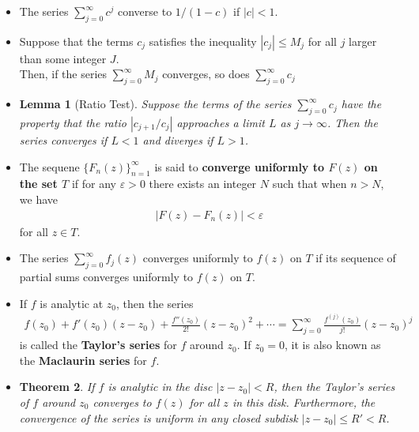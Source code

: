 \documentclass[10pt]{article}
\newtheorem{lemma}{Lemma}[section]
\newtheorem{theorem}[lemma]{Theorem}
\newcommand{\ra}{\rightarrow}
\begin{document}
  \begin{itemize}
    \item The series $\sum_{j=0}^\infty c^j$ converse to $1 / (1-c)$ if $|c| < 1$.

    \item Suppose that the terms $c_j$ satisfies the inequality $|c_j| \leq M_j$ for all $j$ larger than some integer $J$.\\Then, if the series $\sum_{j=0}^\infty M_j$ converges, so does $\sum_{j=0}^\infty c_j$

    \item \begin{lemma}[Ratio Test]
      Suppose the terms of the series $\sum_{j=0}^\infty c_j$ have the property that the ratio $|c_{j+1}/c_j|$ approaches a limit $L$ as $j \ra \infty$. Then the series converges if $L < 1$ and diverges if $L > 1$.
    \end{lemma}

    \item The sequene $\{ F_n(z) \}_{n=1}^\infty$ is said to {\bf converge uniformly to $F(z)$ on the set $T$} if for any $\varepsilon > 0$ there exists an integer $N$ such that when $n > N$, we have
    \begin{align*}
      |F(z) - F_n(z)| < \varepsilon
    \end{align*}
    for all $z \in T$.

    \item The series $\sum_{j=0}^\infty f_j(z)$ converges uniformly to $f(z)$ on $T$ if its sequence of partial sums converges uniformly to $f(z)$ on $T$.

    \item If $f$ is analytic at $z_0$, then the series
    \begin{align*}
      f(z_0) + f'(z_0)(z-z_0) + \frac{f''(z_0)}{2!}(z-z_0)^2 + \dotsb = \sum_{j=0}^\infty \frac{f^{(j)}(z_0)}{j!}(z-z_0)^j
    \end{align*}
    is called the {\bf Taylor's series} for $f$ around $z_0$. If $z_0 = 0$, it is also known as the {\bf Maclaurin series} for $f$.

    \item \begin{theorem}
      If $f$ is analytic in the disc $|z - z_0| < R$, then the Taylor's series of $f$ around $z_0$ converges to $f(z)$ for all $z$ in this disk. Furthermore, the convergence of the series is uniform in any closed subdisk $|z-z_0| \leq R' < R$.
    \end{theorem}


\end{itemize}
\end{document}
